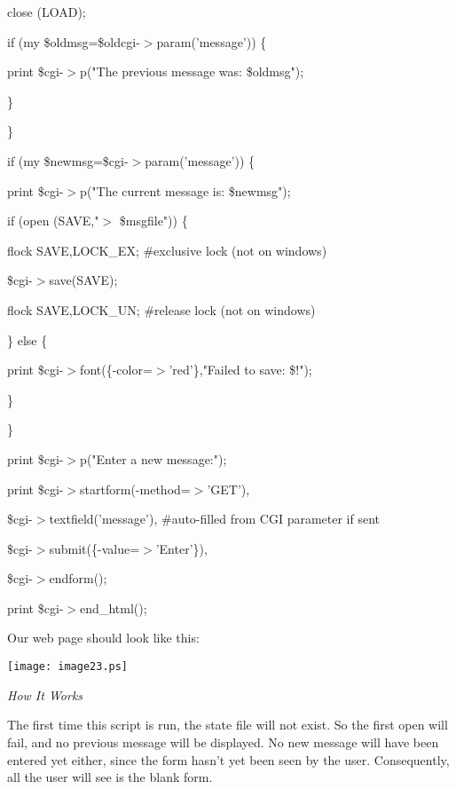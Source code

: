 \documentclass[a4paper,11pt]{book}
\begin{document}
\noindent close (LOAD);

\noindent 

\noindent if (my \$oldmsg=\$oldcgi-$>$param('message')) \{

\noindent print \$cgi-$>$p("The previous message was: \$oldmsg");

\noindent \}

\noindent \}

\noindent 

\noindent if (my \$newmsg=\$cgi-$>$param('message')) \{

\noindent print \$cgi-$>$p("The current message is: \$newmsg");

\noindent if (open (SAVE,"$>$ \$msgfile")) \{

\noindent flock SAVE,LOCK\_EX; \#exclusive lock (not on windows)

\noindent \$cgi-$>$save(SAVE);

\noindent flock SAVE,LOCK\_UN; \#release lock (not on windows)

\noindent \} else \{

\noindent print \$cgi-$>$font(\{-color=$>$'red'\},"Failed to save: \$!");

\noindent \}

\noindent \}

\noindent print \$cgi-$>$p("Enter a new message:");

\noindent print \$cgi-$>$startform(-method=$>$'GET'),

\noindent \$cgi-$>$textfield('message'), \#auto-filled from CGI parameter if sent

\noindent \$cgi-$>$submit(\{-value=$>$'Enter'\}),

\noindent \$cgi-$>$endform();

\noindent 

\noindent print \$cgi-$>$end\_html();

\noindent 

\noindent Our web page should look like this:

\noindent 

\noindent \texttt{[image: image23.ps]}

\noindent 

\noindent 

\noindent \textit{How It Works}

\noindent The first time this script is run, the state file will not exist. So the first open will fail, and no previous message will be displayed. No new message will have been entered yet either, since the form hasn't yet been seen by the user. Consequently, all the user will see is the blank form.
\end{document}
